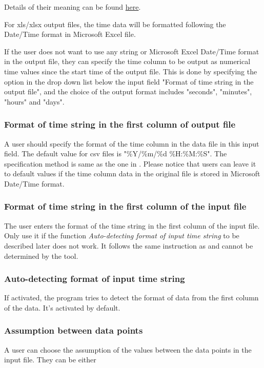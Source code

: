 \documentclass[12pt,a4paper]{article}
\begin{document}
Details of their meaning can be found \href{https://docs.python.org/3.5/library/datetime.html\#strftime-and-strptime-behavior}{here}.

For xls/xlsx output files, the time data will be formatted following the Date/Time format in Microsoft Excel file.

If the user does not want to use any string or Microsoft Excel Date/Time format in the output file, they can specify the time column to be output as numerical time values since the start time of the output file.
This is done by specifying the option in the drop down list below the input field "Format of time string in the output file", and the choice of the output format includes "seconds", "minutes", "hours" and "days".

\subsubsection{Format of time string in the first column of output file}
A user should specify the format of the time column in the data file in this input field.
The default value for csv files is "\%Y/\%m/\%d \%H:\%M:\%S".
The specification method is same as the one in .
Please notice that users can leave it to default values if the time column data in the original file is stored in Microsoft Date/Time format.

\subsubsection{Format of time string in the first column of the input file}
The user enters the format of the time string in the first column of the input file.
Only use it if the function \emph{Auto-detecting format of input time string} to be described later does not work.
It follows the same instruction as  and cannot be determined by the tool.

\subsubsection{Auto-detecting format of input time string}
If activated, the program tries to detect the format of data from the first column of the data.
It's activated by default.

\subsubsection{Assumption between data points}
\label{subsec:assume_bet_dat}
A user can choose the assumption of the values between the data points in the input file.
They can be either
\end{document}

